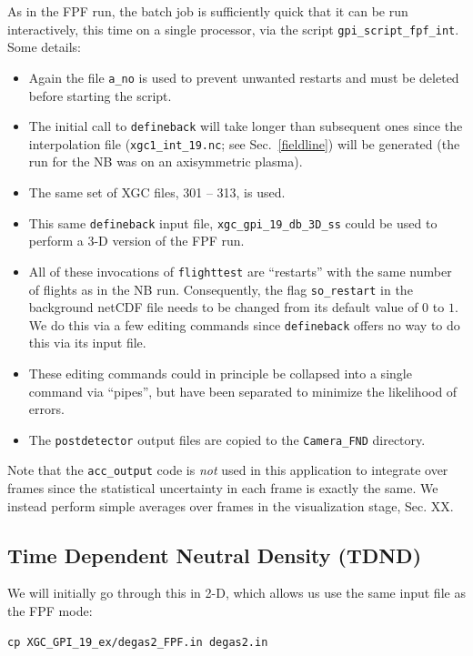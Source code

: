 \documentclass[12pt]{report}
\begin{document}
As in the FPF run, the batch job is sufficiently quick that
it can be run interactively, this time on a
single processor, via the script
{\tt gpi\_script\_fpf\_int}.  Some details:
\begin{itemize}
\item Again the file {\tt a\_no} is used to prevent unwanted
  restarts and must be deleted before starting the script.
\item The initial call to {\tt defineback} will take longer
  than subsequent ones since the interpolation file
  ({\tt xgc1\_int\_19.nc}; see Sec.~\ref{fieldline}) will
  be generated (the run for the
  NB was on an axisymmetric plasma).
\item The same set of XGC files,  301 -- 313, is used.
\item This same {\tt defineback} input file,
  {\tt xgc\_gpi\_19\_db\_3D\_ss} could be used to
  perform a 3-D version of the FPF run.
\item All of these invocations of {\tt flighttest} are
  ``restarts'' with the same number of flights as in
  the NB run.  Consequently, the flag {\tt so\_restart}
  in the background netCDF file needs to be changed from
  its default value of $0$ to $1$.  We do this via a
  few editing commands since {\tt defineback} offers no
  way to do this via its input file.
\item These editing commands could in principle be collapsed
  into a single command via ``pipes'', but have been separated
  to minimize the likelihood of errors.
\item The {\tt postdetector} output files are copied to the
  {\tt Camera\_FND} directory.
\end{itemize}

Note that the {\tt acc\_output} code is {\em not} used
in this application to integrate over frames since the
statistical uncertainty in each frame is exactly the same.
We instead perform simple averages over frames in the
visualization stage, Sec. XX.

\subsection{Time Dependent Neutral Density (TDND)}
\label{tdnd}

We will initially go through this in 2-D, which allows us
use the same input file as the FPF mode:
\begin{verbatim}
cp XGC_GPI_19_ex/degas2_FPF.in degas2.in
\end{verbatim}
\end{document}
